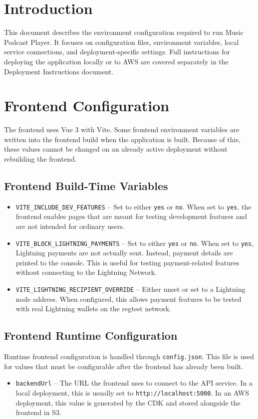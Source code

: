 \documentclass{article}
\begin{document}
\section{Introduction}
This document describes the environment configuration required to run Music Podcast Player. It focuses on configuration files, environment variables, local service connections, and deployment-specific settings. Full instructions for deploying the application locally or to AWS are covered separately in the Deployment Instructions document.
\section{Frontend Configuration}
The frontend uses Vue 3 with Vite. Some frontend environment variables are written into the frontend build when the application is built. Because of this, these values cannot be changed on an already active deployment without rebuilding the frontend.
\subsection{Frontend Build-Time Variables}
\begin{itemize}
    \item \texttt{VITE\_INCLUDE\_DEV\_FEATURES} -- Set to either
    \texttt{yes} or \texttt{no}. When set to \texttt{yes}, the frontend enables pages that are meant for testing development features and are not intended for ordinary users.
    \item \texttt{VITE\_BLOCK\_LIGHTNING\_PAYMENTS} -- Set to either \texttt{yes} or \texttt{no}. When set to \texttt{yes}, Lightning payments are not actually sent. Instead, payment details are printed to the console. This is useful for testing payment-related features without connecting to the Lightning Network.
    \item \texttt{VITE\_LIGHTNING\_RECIPIENT\_OVERRIDE} -- Either unset or set to a Lightning node address. When configured, this allows payment features to be tested with real Lightning wallets on the regtest network.
\end{itemize}
\subsection{Frontend Runtime Configuration}
Runtime frontend configuration is handled through \texttt{config.json}. This file is used for values that must be configurable after the frontend has already been built.
\begin{itemize}
    \item \texttt{backendUrl} -- The URL the frontend uses to connect to the API service. In a local deployment, this is usually set to \texttt{http://localhost:5000}. In an AWS deployment, this value is generated by the CDK and stored alongside the frontend in S3.
\end{itemize}
\end{document}

